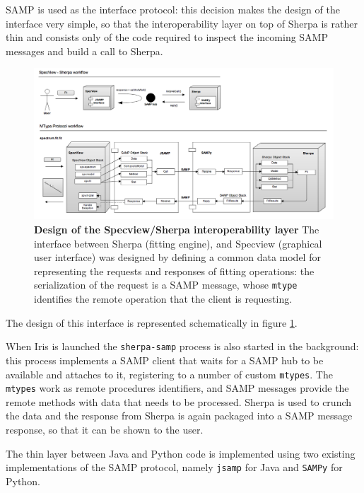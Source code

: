 \documentclass[5p]{elsarticle}
\begin{document}
SAMP is used as the interface protocol: this decision makes the design of the interface very simple, so that the interoperability layer on top of Sherpa is rather thin and consists only of the code required to inspect the incoming SAMP messages and build a call to Sherpa.

\begin{figure}
\label{fig:sherpasamp}
\begin{center}
\includegraphics[width=\columnwidth]{figures/sherpasamp.png}
\caption{\textbf{Design of the Specview/Sherpa interoperability layer} The interface between Sherpa (fitting engine), and Specview (graphical user interface) was designed by defining a common data model for representing the requests and responses of fitting operations: the serialization of the request is a SAMP message, whose \texttt{mtype} identifies the remote operation that the client is requesting.}
\end{center}
\end{figure}

The design of this interface is represented schematically in figure \ref{fig:sherpasamp}.

When Iris is launched the \verb|sherpa-samp| process is also started in the background: this process implements a SAMP client that waits for a SAMP hub to be available and attaches to it, registering to a number of custom \verb|mtypes|. The \verb|mtypes| work as remote procedures identifiers, and SAMP messages provide the remote methods with data that needs to be processed. Sherpa is used to crunch the data and the response from Sherpa is again packaged into a SAMP message response, so that it can be shown to the user.

The thin layer between Java and Python code is implemented using two existing implementations of the SAMP protocol, namely \verb|jsamp| for Java and \verb|SAMPy| for Python.
\end{document}

